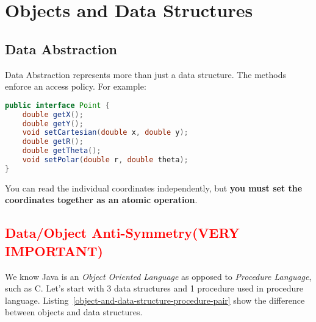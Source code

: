 
\chapter{Objects and Data Structures}

\section{Data Abstraction}

Data Abstraction represents more than just a data structure. The methods enforce an access policy. For example:

\begin{tcolorbox}[breakable, colback=red!10!white, colframe=red!85!black]
\begin{lstlisting}[language = java, basicstyle=\small]
public interface Point {
    double getX();
    double getY();
    void setCartesian(double x, double y);
    double getR();
    double getTheta();
    void setPolar(double r, double theta);
}
\end{lstlisting}
\end{tcolorbox}

You can read the individual coordinates independently, but \textbf{you must set the coordinates together as an atomic operation}.

\section{\textcolor{red}{Data/Object Anti-Symmetry(VERY IMPORTANT)}}

We know Java is an \textit{Object Oriented Language} as opposed to \textit{Procedure Language}, such as C. Let's start with 3 data structures and 1 procedure used in procedure language. Listing~\ref{object-and-data-structure-procedure-pair} show the difference between objects and data structures.

